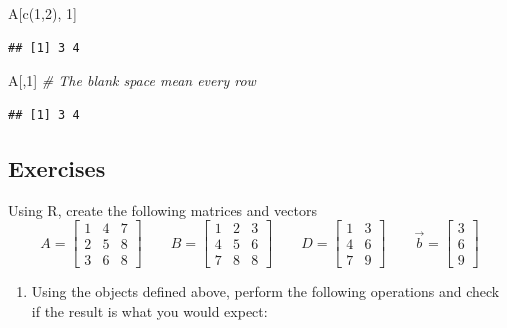 \documentclass[
]{book}
\newenvironment{Shaded}{\begin{snugshade}}{\end{snugshade}}
\newcommand{\CommentTok}[1]{\textcolor[rgb]{0.56,0.35,0.01}{\textit{#1}}}
\newcommand{\DecValTok}[1]{\textcolor[rgb]{0.00,0.00,0.81}{#1}}
\newcommand{\FunctionTok}[1]{\textcolor[rgb]{0.00,0.00,0.00}{#1}}
\newcommand{\NormalTok}[1]{#1}
\providecommand{\tightlist}{%
  \setlength{\itemsep}{0pt}\setlength{\parskip}{0pt}}
\theoremstyle{definition}
\theoremstyle{definition}
\theoremstyle{definition}
\theoremstyle{definition}
\theoremstyle{remark}
\begin{document}
\begin{Shaded}
\begin{Highlighting}[]
\NormalTok{A[}\FunctionTok{c}\NormalTok{(}\DecValTok{1}\NormalTok{,}\DecValTok{2}\NormalTok{), }\DecValTok{1}\NormalTok{]}
\end{Highlighting}
\end{Shaded}

\begin{verbatim}
## [1] 3 4
\end{verbatim}

\begin{Shaded}
\begin{Highlighting}[]
\NormalTok{A[,}\DecValTok{1}\NormalTok{] }\CommentTok{\# The blank space mean every row}
\end{Highlighting}
\end{Shaded}

\begin{verbatim}
## [1] 3 4
\end{verbatim}

\hypertarget{exercises-1}{%
\subsection{Exercises}\label{exercises-1}}

Using R, create the following matrices and vectors
\[ A=\left[ \begin{array}{ccc}
1 & 4 & 7 \\
2 & 5 & 8 \\
3 & 6 & 8 \end{array}\right] \qquad
B=\left[ \begin{array}{ccc}
1 & 2 & 3 \\
4 & 5 & 6 \\
7 & 8 & 8 \end{array}\right]
 \qquad
D=\left[ \begin{array}{cc}
1 & 3 \\
4 & 6 \\
7 & 9 \end{array}\right]
 \qquad
\vec{b}=\left[ \begin{array}{c}
 3 \\
 6 \\
 9 \end{array}\right]
\]

\begin{enumerate}
\def\labelenumi{\arabic{enumi}.}
\tightlist
\item
  Using the objects defined above, perform the following operations and check if the result is what you would expect:
\end{enumerate}
\end{document}
